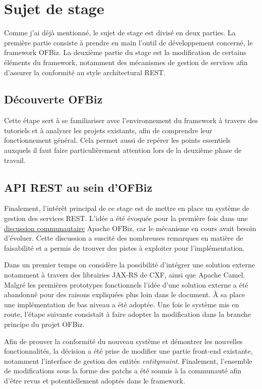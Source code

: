 \section{Sujet de stage }
Comme j'ai déjà mentionné, le sujet de stage est divisé en deux parties. La première partie consiste à prendre en main l'outil de développement concerné, le framework OFBiz. La deuxième partie du stage est la modification de certains éléments du framework, notamment des mécanismes de gestion de services afin d'assurer la conformité au style architectural REST.  

\subsection{Découverte OFBiz}
Cette étape sert à se familiariser avec l'environnement du framework à travers des tutoriels et à analyser les projets existants, afin de comprendre leur fonctionnement général. Cela permet aussi de repérer les points essentiels auxquels il faut faire particulièrement attention lors de la deuxième phase de travail. 

\subsection{API REST au sein d'OFBiz}

Finalement, l'intérêt principal de ce stage est de mettre en place un système de gestion des services REST. L'idée a été évoquée pour la première fois dans une \href{https://issues.apache.org/jira/browse/OFBIZ-4274}{discussion communautaire} Apache OFBiz, car le mécanisme en cours avait besoin d'évoluer. Cette discussion a suscité des nombreuses remarques en matière de faisabilité et a permis de trouver des pistes à exploiter pour l'implémentation.

Dans un premier temps on considère la possibilité d'intégrer une solution externe notamment à travers des librairies JAX-RS de CXF, ainsi que Apache Camel. Malgré les premières prototypes fonctionnels l'idée d'une solution externe a été abandonné pour des raisons expliquées plus loin dans le document. À sa place une implémentation de bas niveau a été adoptée. Une fois le système mis en route, l'étape suivante consistait à faire adopter la modification dans la branche principe du projet OFBiz. 

Afin de prouver la conformité du nouveau système et démontrer les nouvelles fonctionnalités, la décision a été prise de modifier une partie front-end existante, notamment l'interface de gestion des entités \emph{entitymaint}. Finalement, l'ensemble de modifications sous la forme des patchs a été soumis à la communauté afin d'être revus et potentiellement adoptés dans le framework. 









